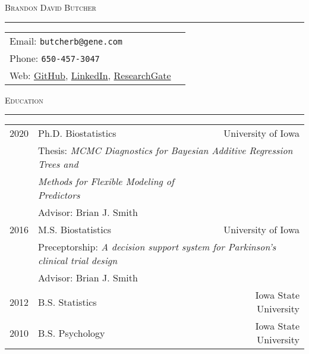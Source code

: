 \documentclass[a4paper]{article}
\newcommand{\LinkedIn}{\href{https://www.linkedin.com/in/brandon-butcher-72250153/}{LinkedIn}}
\newcommand{\ResearchGate}{\href{https://www.researchgate.net/profile/Brandon_Butcher}{ResearchGate}}
\newcommand{\GitHub}{\href{https://github.com/brandondbutcher}{GitHub}}
\begin{document}
\begin{center}
  \Huge\textsc{Brandon David Butcher}
  \textcolor{usafagrey}{\rule{\textwidth}{1pt}}
\end{center}


\begin{tabular*}{0.95\textwidth}{@{\extracolsep{\fill}}lr}
Email: \texttt{butcherb@gene.com} \\
Phone: \texttt{650-457-3047} \\
Web: \GitHub, \LinkedIn, \ResearchGate \\
\end{tabular*}
\vspace{\baselineskip}


\begin{flushleft}
  \Large\textsc{Education}
  \textcolor{usafagrey}{\rule[0.5\baselineskip]{\textwidth}{0.75pt}}
\end{flushleft}
\vspace{-\baselineskip}

\begin{tabular*}{0.96\textwidth}{@{\extracolsep{\fill}}clr}
  2020 & Ph.D. Biostatistics & University of Iowa \\
    & \multicolumn{2}{l}{Thesis: \textit{
  MCMC Diagnostics for Bayesian Additive Regression Trees and}} \\
    & \textit{\qquad \qquad Methods for Flexible Modeling of Predictors} & \\
    & Advisor: Brian J. Smith & \\[3pt]
  2016 & M.S. Biostatistics & University of Iowa \\
    & \multicolumn{2}{l}{
      Preceptorship: \textit{
        A decision support system for Parkinson's clinical trial design
      }} \\
    & Advisor: Brian J. Smith & \\[3pt]
  2012 & B.S. Statistics & Iowa State University \\
  2010 & B.S. Psychology & Iowa State University
\end{tabular*}
\vspace{0.25\baselineskip}


%
\end{document}
